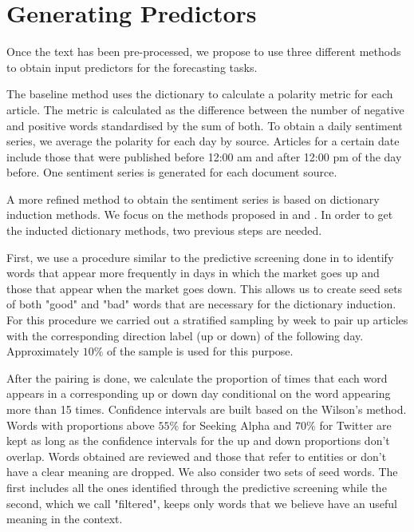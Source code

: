 \documentclass[a4paper, 12pt]{report}
\begin{document}
    
    \section{Generating Predictors}
    \label{predictor}
    Once the text has been pre-processed, we propose to use three different methods to obtain input predictors for the forecasting tasks. 
    
    The baseline method uses the \textcite{Loughran:2011} dictionary to calculate a polarity metric for each article. The metric is calculated as the difference between the number of negative and positive words standardised by the sum of both. To obtain a daily sentiment series, we average the polarity for each day by source. Articles for a certain date include those that were published before 12:00 am and after 12:00 pm of the day before. One sentiment series is generated for each document source. 
    
    A more refined method to obtain the sentiment series is based on dictionary induction methods. We focus on the methods proposed in \textcite{Hamilton:2016} and \textcite{An:2018}. In order to get the inducted dictionary methods, two previous steps are needed. 
    
    First, we use a procedure similar to the predictive screening done in \textcite{Ke:2019} to identify words that appear more frequently in days in which the market goes up and those that appear when the market goes down. This allows us to create seed sets of both "good" and "bad" words that are necessary for the dictionary induction.  For this procedure we carried out a stratified sampling by week to pair up articles with the corresponding direction label (up or down) of the following day. Approximately $10\%$ of the sample is used for this purpose.
    
    After the pairing is done, we calculate the proportion of times that each word appears in a corresponding up or down day conditional on the word appearing more than 15 times. Confidence intervals are built based on the Wilson's method. Words with proportions above $55\%$ for Seeking Alpha and $70\%$ for Twitter are kept as long as the confidence intervals for the up and down proportions don't overlap. Words obtained are reviewed and those that refer to entities or don't have a clear meaning are dropped. We also consider two sets of seed words. The first includes all the ones identified through the predictive screening while the second, which we call "filtered", keeps only words that we believe have an useful meaning in the context. 
    
\end{document}
